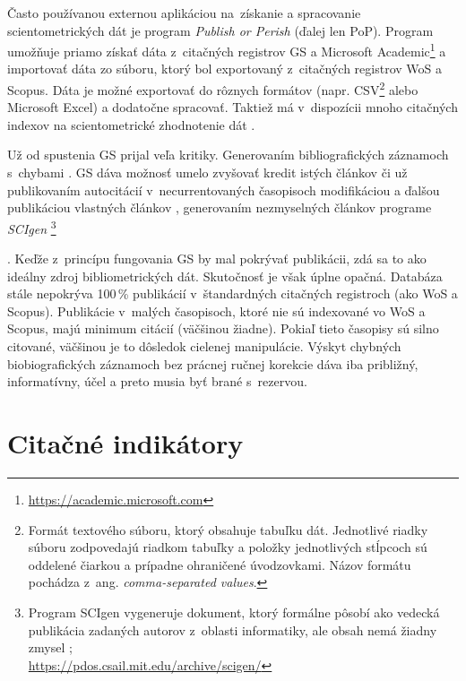 Často používanou externou aplikáciou na~získanie a spracovanie scientometrických
dát je program \emph{Publish or Perish} (ďalej
len PoP).  Program umožňuje priamo získať dáta z~citačných registrov GS a
Microsoft Academic\footnote{\url{https://academic.microsoft.com}} a importovať
dáta zo súboru, ktorý bol exportovaný z~citačných registrov WoS a Scopus.  Dáta
je možné exportovať do rôznych formátov (napr. CSV\footnote{Formát textového
súboru, ktorý obsahuje tabuľku dát. Jednotlivé riadky súboru zodpovedajú
riadkom tabuľky a položky jednotlivých stĺpcoch sú oddelené čiarkou a prípadne
ohraničené úvodzovkami.  Názov formátu pochádza z~ang. \emph{comma-separated
values}.} alebo Microsoft Excel) a dodatočne spracovať. Taktiež má
v~dispozícii mnoho citačných indexov na scientometrické zhodnotenie dát
\citep{Harzing2011}.

Už od spustenia GS prijal veľa kritiky.  Generovaním bibliografických záznamoch
s~chybami \citep{Jacso2009,Jacso2010}.  GS dáva možnosť umelo zvyšovať kredit
istých článkov či už publikovaním autocitácií v~necurrentovaných časopisoch
modifikáciou a ďalšou publikáciou vlastných článkov \citep{Beel2010b},
generovaním nezmyselných článkov programe \emph{SCIgen}
\footnote{Program SCIgen vygeneruje dokument, ktorý formálne pôsobí ako
vedecká publikácia zadaných autorov z~oblasti informatiky, ale obsah nemá
žiadny zmysel \citep{Labbe2013};\\\url{https://pdos.csail.mit.edu/archive/scigen/}}

\citep{Beel2010a}.
Keďže z~princípu fungovania GS by mal pokrývať publikácii, zdá sa to ako
ideálny zdroj bibliometrických dát.  Skutočnosť je však úplne opačná. Databáza
stále nepokrýva 100\,\% publikácií v~štandardných citačných registroch (ako WoS
a Scopus). Publikácie v~malých časopisoch, ktoré nie sú indexované vo WoS a Scopus,
majú minimum citácií (väčšinou žiadne). Pokiaľ tieto časopisy sú silno citované,
väčšinou je to dôsledok cielenej manipulácie.  Výskyt chybných biobiografických
záznamoch bez prácnej ručnej korekcie dáva iba približný, informatívny, účel a
preto musia byť brané s~rezervou.


\section{Citačné indikátory}
\label{sec:indicators}

